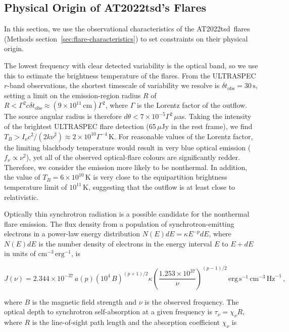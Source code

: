\documentclass{nature_plusfigure}
\newcommand{\at}{AT2022tsd}
\begin{document}
\begin{methods}
\section{Physical Origin of \at's Flares}
\label{sec:flare-origin}

In this section, we use the observational characteristics of the \at\ flares (Methods section~\ref{sec:flare-characteristics}) to set constraints on their physical origin.

The lowest frequency with clear detected variability is the optical band, so we use this to estimate the brightness temperature of the flares.
From the ULTRASPEC $r$-band observations, the shortest timescale of variability we resolve is $\delta t_\mathrm{obs} = 30\,\mathrm{s}$, setting a limit on the emission-region radius $R$ of $R<\Gamma^2 c \delta t_\mathrm{obs} \approx (9\times10^{11}\,\mathrm{cm}) \Gamma^2$, where $\Gamma$ is the Lorentz factor of the outflow. 
The source angular radius is therefore $d\theta < 7 \times 10^{-5} \Gamma^2 \,\mu$as. Taking the intensity of the brightest ULTRASPEC flare detection (65\,$\mu$Jy in the rest frame), we find $T_B > I_\nu c^2/(2 k\nu^2) \approx 2\times10^{10} \Gamma^{-4} \,$K.
For reasonable values of the Lorentz factor,
the limiting blackbody temperature would result in very blue optical emission ($f_\nu\propto\nu^2$), yet all of the observed optical-flare colours are significantly redder.
Therefore, we consider the emission more likely to be nonthermal.
In addition, the value of $T_B=6\times10^{10}\,$K is very close to the equipartition brightness temperature limit\cite{Readhead1994} of $10^{11}$\,K, suggesting that the outflow is at least close to relativistic. 

Optically thin synchrotron radiation is a possible candidate for the nonthermal flare emission. The flux density from a population of synchrotron-emitting electrons in a power-law energy distribution $N(E)dE = \kappa E^{-p} dE$, where $N(E)dE$ is the number density of electrons in the energy interval $E$ to $E+dE$ in units of $\mathrm{cm}^{-3}\,\mathrm{erg}^{-1}$, is\cite{Longair2011}

\begin{equation}
\label{eq:synchrotron-flux}
    J(\nu) = 2.344\times10^{-37}\, a(p) (10^4\,B)^{(p+1)/2} \kappa \left( \frac{1.253\times10^{37}}{\nu} \right)^{(p-1)/2}\,\mathrm{erg}\,\mathrm{s}^{-1}\,\mathrm{cm}^{-3}\,\mathrm{Hz}^{-1}\,,
\end{equation}

\noindent where $B$ is the magnetic field strength and $\nu$ is the observed frequency. The optical depth to synchrotron self-absorption at a given frequency is $\tau_\nu = \chi_\nu R$, where $R$ is the line-of-sight path length and the absorption coefficient $\chi_\nu$ is


\end{methods}
\end{document}
